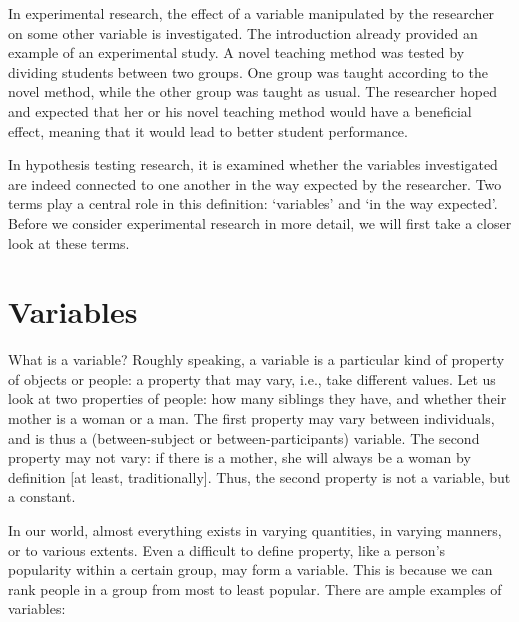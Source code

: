 \documentclass[
]{book}
\begin{document}
In experimental research, the effect of a variable manipulated by the researcher on some other variable is investigated. The introduction already provided an example of an experimental study. A novel teaching method was tested by dividing students between two groups. One group was taught according to the novel method, while the other group was taught as usual. The researcher hoped and expected that her or his novel teaching method would have a beneficial effect, meaning that it would lead to better student performance.

In hypothesis testing research, it is examined whether the variables investigated are indeed connected to one another in the way expected by the researcher. Two terms play a central role in this definition: `variables' and `in the way expected'. Before we consider experimental research in more detail, we will first take a closer look at these terms.

\section{Variables}\label{sec:variables}

What is a variable? Roughly speaking, a variable is a particular kind of property of objects or people: a property that may vary, i.e., take different values. Let us look at two properties of people: how many siblings they have, and whether their mother is a woman or a man. The first property may vary between individuals, and is thus a (between-subject or between-participants) variable. The second property may not vary: if there is a mother, she will always be a woman by definition {[}at least, traditionally{]}. Thus, the second property is not a variable, but a constant.

In our world, almost everything exists in varying quantities, in varying manners, or to various extents. Even a difficult to define property, like a person's popularity within a certain group, may form a variable. This is because we can rank people in a group from most to least popular. There are ample examples of variables:
\end{document}
